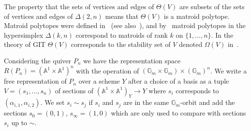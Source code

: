 \documentclass[10pt,a4paper]{amsart}
\theoremstyle{definition}
\def\A{\mathds A}
\def\G{\mathds G}
\begin{document}
The property that the sets of vertices and edges of $\Theta(V)$
are subsets of the sets of vertices and edges of $\Delta(2,n)$ means
that $\Theta(V)$ is a matroid polytope.
Matroid polytopes were defined in~\cite{GGMS87} (see also~\cite[(1.2.6)]{Ka93a}), 
and by~\cite[Thm.~4.1]{GGMS87} matroid polytopes in the hypersimplex $\Delta(k,n)$
correspond to matroids of rank $k$ on $\{1,\ldots,n\}$.
In the theory of GIT $\Theta(V)$ corresponds to the stability set of $V$ 
denoted $\Omega(V)$ in~\cite{Re00}.


Considering the quiver $P_n$ we have the representation space $R(P_n)=(\A^1\times\A^1)^n$ 
with the operation of $(\G_m\times\G_m)\times(\G_m)^n$. We write a free representation 
of $P_n$ over a scheme $Y$ after a choice of a basis as a tuple $V=(s_1,\ldots,s_n)$ 
of sections of $(\A^1\times\A^1)_Y\to Y$ where $s_i$ corresponds to 
$(\alpha_{i,1},\alpha_{i,2})$.
We set $s_i\sim s_j$ if $s_i$ and $s_j$ are in the same $\G_m$-orbit and add 
the sections $s_0=(0,1)$, $s_\infty=(1,0)$ which are only used to compare with 
sections $s_i$ up to $\sim$.
\end{document}
